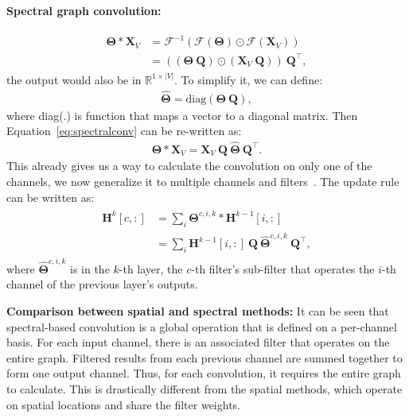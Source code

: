 \vspace{2mm}
\noindent \textbf{Spectral graph convolution:}

\begin{gather}
\label{eq:spectralconv}
\begin{split}
\mathbf{\Theta} \ast \mathbf{X}_V & = \mathcal{F}^{-1}(\mathcal{F}(\mathbf{\Theta}) \odot \mathcal{F}(\mathbf{X}_V)) \\
& = ((\mathbf{\Theta}~\mathbf{Q}) \odot (\mathbf{X}_V~\mathbf{Q}))~\mathbf{Q}^\intercal,
\end{split}
\end{gather}
the output would also be in $\mathbb{R}^{1 \times |V|}$. To simplify it, we can define:
\begin{gather}
\hat {\mathbf{\Theta}} = \text{diag}(\mathbf{\Theta}~\mathbf{Q}),
\end{gather}
where diag(.) is function that maps a vector to a diagonal matrix. Then Equation~\ref{eq:spectralconv} can be re-written as:
\begin{gather}
\label{eq:spectralconvfin}
\mathbf{\Theta} \ast \mathbf{X}_V = \mathbf{X}_V~\mathbf{Q}~\hat{\mathbf{\Theta}}~\mathbf{Q}^\intercal.
\end{gather}
This already gives us a way to calculate the convolution on only one of the channels, we now generalize it to multiple channels and filters~\cite{spectralgnn}. The update rule can be written as:
\begin{gather}
\begin{split}
\mathbf{H}^k[c, :] & = \sum_i \mathbf{\Theta}^{c, i, k} \ast \mathbf{H}^{k - 1}[i, :] \\
& = \sum_i \mathbf{H}^{k - 1}[i, :]~\mathbf{Q}~\hat{\mathbf{\Theta}}^{c, i, k}~\mathbf{Q}^\intercal,
\end{split}
\end{gather}
where $\hat{\mathbf{\Theta}}^{c, i, k}$ is in the $k$-th layer, the $c$-th filter's sub-filter that operates the $i$-th channel of the previous layer's outputs. 

\vspace{2mm}
\noindent \textbf{Comparison between spatial and spectral methods:}
It can be seen that spectral-based convolution is a global operation that is defined on a per-channel basis. For each input channel, there is an associated filter that operates on the entire graph. Filtered results from each previous channel are summed together to form one output channel. Thus, for each convolution, it requires the entire graph to calculate. This is drastically different from the spatial methods, which operate on spatial locations and share the filter weights. 



